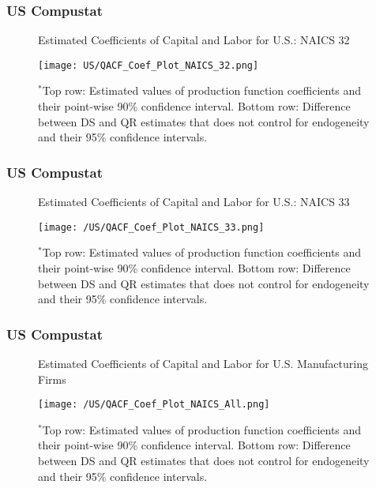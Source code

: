 \documentclass[xcolor={dvipsnames}, notheorems]{beamer}
\theoremstyle{plain}
\begin{document}

\begin{frame}
\frametitle{US Compustat}
\begin{figure}[H]
\centering
\caption{Estimated Coefficients of Capital and Labor for U.S.: NAICS 32}
\texttt{[image: US/QACF\_Coef\_Plot\_NAICS\_32.png]}
\caption*{\footnotesize $^{*}$Top row: Estimated values of production function coefficients and their point-wise 90\% confidence interval. Bottom row: Difference between DS and QR estimates that does not control for endogeneity and their 95\% confidence intervals.}
\end{figure}
\end{frame}


\begin{frame}
\frametitle{US Compustat}
\begin{figure}[H]
\centering
\caption{Estimated Coefficients of Capital and Labor for U.S.: NAICS 33}
\texttt{[image: /US/QACF\_Coef\_Plot\_NAICS\_33.png]}
\caption*{\footnotesize $^{*}$Top row: Estimated values of production function coefficients and their point-wise 90\% confidence interval. Bottom row: Difference between DS and QR estimates that does not control for endogeneity and their 95\% confidence intervals.}
\end{figure}
\end{frame}


\begin{frame}
\frametitle{US Compustat}
\begin{figure}[H]
\centering
\caption{Estimated Coefficients of Capital and Labor for U.S. Manufacturing Firms}
\texttt{[image: /US/QACF\_Coef\_Plot\_NAICS\_All.png]}
\caption*{\footnotesize $^{*}$Top row: Estimated values of production function coefficients and their point-wise 90\% confidence interval. Bottom row: Difference between DS and QR estimates that does not control for endogeneity and their 95\% confidence intervals.}
\end{figure}
\end{frame}

\end{document}

